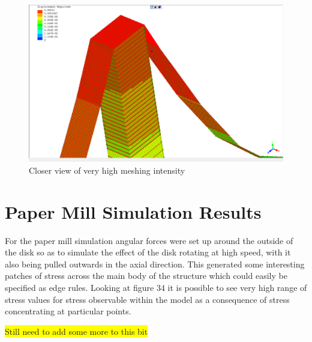 \begin{figure}[H]
  \centerline{\includegraphics[width=165mm, scale=0.5]{../Graphics/BridgeCrossLoading/aboveAverageRefinement.png}}
  \caption{Closer view of very high meshing intensity}
\end{figure}



\section{Paper Mill Simulation Results}
For the paper mill simulation angular forces were set up around the outside of the disk so as to simulate the effect of the disk rotating at high speed, with it also being pulled outwards in the axial direction. This generated some interesting patches of stress across the main body of the structure which could easily be specified as edge rules. Looking at figure 34 it is possible to see very high range of stress values for stress observable within the model as a consequence of stress concentrating at particular points.


\colorbox{yellow}{Still need to add some more to this bit}

